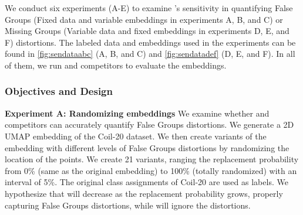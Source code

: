 We conduct six experiments (A-E) to examine \ltc{}'s sensitivity in quantifying False Groups (Fixed data and variable embeddings in experiments A, B, and C) or Missing Groups (Variable data and fixed embeddings in experiments D, E, and F) distortions.
The labeled data and embeddings used in the experiments can be found in \autoref{fig:sendataabc} (A, B, and C) and \autoref{fig:sendatadef} (D, E, and F).
In all of them, we run \ltc and competitors to evaluate the embeddings. 


\subsubsection{Objectives and Design}

\noindent
\textbf{Experiment A: Randomizing embeddings}
We examine whether \ltc and competitors can accurately quantify False Groups distortions. 
We generate a 2D UMAP embedding of the Coil-20 \cite{nene96tech}  dataset. We then create variants of the embedding with different levels of False Groups distortions by randomizing the location of the points.
We create 21 variants, ranging the replacement probability from 0\% (same as the original embedding) to 100\% (totally randomized) with an interval of 5\%. 
The original class assignments of Coil-20 are used as labels. 
We hypothesize that \lt will decrease as the replacement probability grows, properly capturing False Groups distortions, while \lc will ignore the distortions.



